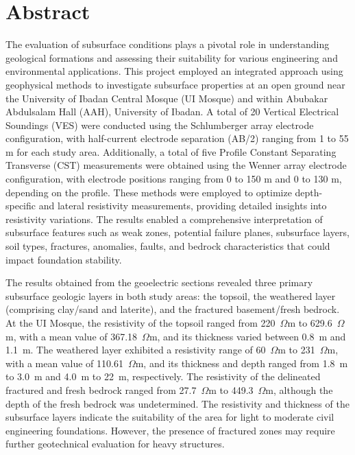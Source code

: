 \documentclass[12pt,a4paper]{report}
\begin{document}
\chapter*{Abstract}
\justifying
The evaluation of subsurface conditions plays a pivotal role in understanding geological formations and assessing their suitability for various engineering and environmental applications. This project employed an integrated approach using geophysical methods to investigate subsurface properties at an open ground near the University of Ibadan Central Mosque (UI Mosque) and within Abubakar Abdulsalam Hall (AAH), University of Ibadan. A total of 20 Vertical Electrical Soundings (VES) were conducted using the Schlumberger array electrode configuration, with half-current electrode separation (AB/2) ranging from 1 to 55 m for each study area. Additionally, a total of five Profile Constant Separating Transverse (CST) measurements were obtained using the Wenner array electrode configuration, with electrode positions ranging from 0 to 150 m and 0 to 130 m, depending on the profile. These methods were employed to optimize depth-specific and lateral resistivity measurements, providing detailed insights into resistivity variations. The results enabled a comprehensive interpretation of subsurface features such as weak zones, potential failure planes, subsurface layers, soil types, fractures, anomalies, faults, and bedrock characteristics that could impact foundation stability.

The results obtained from the geoelectric sections revealed three primary subsurface geologic layers in both study areas: the topsoil, the weathered layer (comprising clay/sand and laterite), and the fractured basement/fresh bedrock. At the UI Mosque, the resistivity of the topsoil ranged from 220~$\Omega$m to 629.6~$\Omega$m, with a mean value of 367.18~$\Omega$m, and its thickness varied between 0.8~m and 1.1~m. The weathered layer exhibited a resistivity range of 60~$\Omega$m to 231~$\Omega$m, with a mean value of 110.61~$\Omega$m, and its thickness and depth ranged from 1.8~m to 3.0~m and 4.0~m to 22~m, respectively. The resistivity of the delineated fractured and fresh bedrock ranged from 27.7~$\Omega$m to 449.3~$\Omega$m, although the depth of the fresh bedrock was undetermined. The resistivity and thickness of the subsurface layers indicate the suitability of the area for light to moderate civil engineering foundations. However, the presence of fractured zones may require further geotechnical evaluation for heavy structures.
\end{document}
